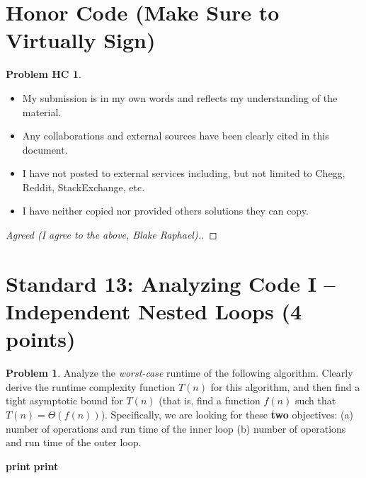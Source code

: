 \documentclass[11pt]{article}
\theoremstyle{definition}
\theoremstyle{definition}
\newtheorem{required}{Problem}
\newtheorem*{requiredHC}{Problem HC}
\theoremstyle{definition}
\begin{document}
\newpage
\section*{Honor Code (Make Sure to Virtually Sign)} \label{HonorCode}
\hypertarget{HonorCode}{}

\begin{requiredHC}
\begin{itemize}
\item My submission is in my own words and reflects my understanding of the material.
\item Any collaborations and external sources have been clearly cited in this document.
\item I have not posted to external services including, but not limited to Chegg, Reddit, StackExchange, etc.
\item I have neither copied nor provided others solutions they can copy.
\end{itemize}

\end{requiredHC}

\begin{proof}[Agreed (I agree to the above, Blake Raphael).]
\end{proof}


\newpage
\setcounter{section}{12}
\section{Standard 13: Analyzing Code I -- Independent Nested Loops (4 points)}

\setcounter{required}{12}
\begin{required} 
Analyze the \textit{worst-case} runtime of the following algorithm. Clearly derive the runtime complexity function $T(n)$ for this algorithm, and then find a tight asymptotic bound for $T(n)$ (that is, find a function $f(n)$ such that $T(n) = \Theta(f(n))$). Specifically, we are looking for these \textbf{two} objectives: (a) number of operations and run time of the inner loop (b) number of operations and run time of the outer loop.

\begin{algorithm}
	\caption{Nested Algorithm 1}\label{alg:Nested2}
	\begin{algorithmic}[1]
		\State {}
	\EndIf
		\State \textbf{print} 
			\State \textbf{print} 
		\EndFor
	\EndFor
	\EndProcedure
	\end{algorithmic}
\end{algorithm}

\end{required}
\end{document}
